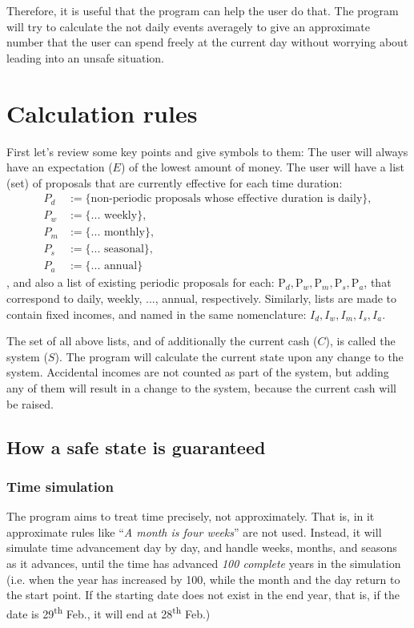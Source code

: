 Therefore, it is useful that the program can help the user do that. The program will try to calculate the not daily events averagely to give an approximate number that the user can spend freely at the current day without worrying about leading into an unsafe situation.

\section{Calculation rules} \label{sec:cal.rule}
First let's review some key points and give symbols to them: The user will always have an expectation ($E$) of the lowest amount of money. The user will have a list (set) of proposals that are currently effective for each time duration:
\begin{align*}
P_d &:= \{\text{non-periodic proposals whose effective duration is daily} \}, 
\\P_w &:= \{\text{... weekly}\}, 
\\P_m &:= \{\text{... monthly}\}, 
\\P_s &:= \{\text{... seasonal}\}, 
\\P_a &:= \{\text{... annual}\}
\end{align*},
and also a list of existing periodic proposals for each: $\mathrm{P}_d, \mathrm{P}_w, \mathrm{P}_m, \mathrm{P}_s, \mathrm{P}_a$, that correspond to daily, weekly, ..., annual, respectively. Similarly, lists are made to contain fixed incomes, and named in the same nomenclature: $I_d, I_w, I_m, I_s, I_a$.

The set of all above lists, and of additionally the current cash ($C$), is called the system ($S$). The program will calculate the current state upon any change to the system. Accidental incomes are not counted as part of the system, but adding any of them will result in a change to the system, because the current cash will be raised.

\subsection{How a safe state is guaranteed}
\subsubsection{Time simulation} \label{subsubsec:cal:state.cal:time.sim}
The program aims to treat time precisely, not approximately. That is, in it approximate rules like ``\emph{A month is four weeks}'' are not used. Instead, it will simulate time advancement day by day, and handle weeks, months, and seasons as it advances, until the time has advanced \emph{100 complete} years in the simulation (i.e. when the year has increased by 100, while the month and the day return to the start point. If the starting date does not exist in the end year, that is, if the date is 29\textsuperscript{th} Feb., it will end at 28\textsuperscript{th} Feb.)

